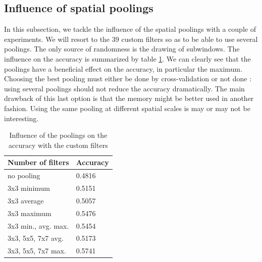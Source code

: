 \documentclass[a4paper]{report}
\begin{document}
	\subsection{Influence of spatial poolings}
	In this subsection, we tackle the influence of the spatial poolings with a couple of experiments. We will resort to the 39 custom filters so as to be able to use several poolings. The only source of randomness is the drawing of subwindows. The influence on the accuracy is summarized by table \ref{tab:AccFpoolings}. We can clearly see that the poolings have a beneficial effect on the accuracy, in particular the maximum. %
	Choosing the best pooling must either be done by cross-validation or not done : using several poolings should not reduce the accuracy dramatically. The main drawback of this last option is that the memory might be better used in another fashion. Using the same pooling at different spatial scales is may or may not be interesting.
	
	\begin{table}
		\centering
			\begin{tabular}{l|l}
			\hline
			Number of filters & Accuracy \\
			\hline \hline
			no pooling & 0.4816 \\
			3x3 minimum & 0.5151\\
			3x3 average & 0.5057 \\
			3x3 maximum & 0.5476 \\
			3x3 min., avg. max. & 0.5454 \\
			3x3, 5x5, 7x7 avg. & 0.5173 \\
			3x3, 5x5, 7x7 max. & 0.5741 \\
			\hline
			\end{tabular}
		\caption{\label{tab:AccFpoolings}Influence of the poolings on the accuracy with the custom filters}
	\end{table}
	
\end{document}
